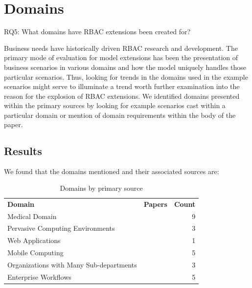 \section{Domains} \label{sec:domains}

RQ5: What domains have RBAC extensions been created for?


Business needs have historically driven RBAC research and development.  The primary mode of evaluation for
model extensions has been the presentation of business scenarios in various domains and how the model
uniquely handles those particular scenarios.  Thus, looking for trends in the domains used in the example
scenarios might serve to illuminate a trend worth further examination into the reason for the explosion of
RBAC extensions.  We identified domains presented within the primary sources by looking for example
scenarios cast within a particular domain or mention of domain requirements within the body of the paper.

\subsection{Results}

We found that the domains mentioned and their associated sources are:

\begin{table}
\centering
\caption{Domains by primary source}
\vspace{0.1 in}
\begin{tabular*}{.9\linewidth}{| p{.45\linewidth} | p{.3\linewidth} | r | }
\cline{1-3}

\textbf{Domain} & \textbf{Papers} & \textbf{Count} \\ \cline{1-3}
Medical Domain
&
\cite{alam06:constraint}
\cite{tzelepi01:flexible}
\cite{motta03:contextual}
\cite{ni2010privacy}
\cite{damiani2007geo}
\cite{hansen2003spatial}
\cite{samuel07:spatio-temporal}
\cite{aich09:role}
\cite{zhou2007team}
&
9 \\ \cline{1-3}
Pervasive Computing Environments
& 
\cite{huang06:pervasive}
\cite{chen08:spatio-temporal}
\cite{ray07:spatio}
&
3 \\ \cline{1-3}
Web Applications
& 
\cite{masoumzadeh2008purbac}
&
1 \\ \cline{1-3}
Mobile Computing
& 
\cite{thein2011leveraging}
\cite{zou2009crbac}
\cite{chandran05:llt}
\cite{ray07:spatio}
\cite{aich09:role}
&
5 \\ \cline{1-3}
Organizations with Many Sub-departments
& 
\cite{yamazaki04:designing}
\cite{jian2008extended}
\cite{yao2008task}
&
3 \\ \cline{1-3}
Enterprise Workflows
&
\cite{cholewka00:acontext-sensitive}
\cite{bao08:role}
\cite{zhang06:collaborative}
\cite{oh2003task}
\cite{joshi05:generalized}
&
5 \\ \cline{1-3}

\end{tabular*}
\label{tab:implementations}
\end{table}

